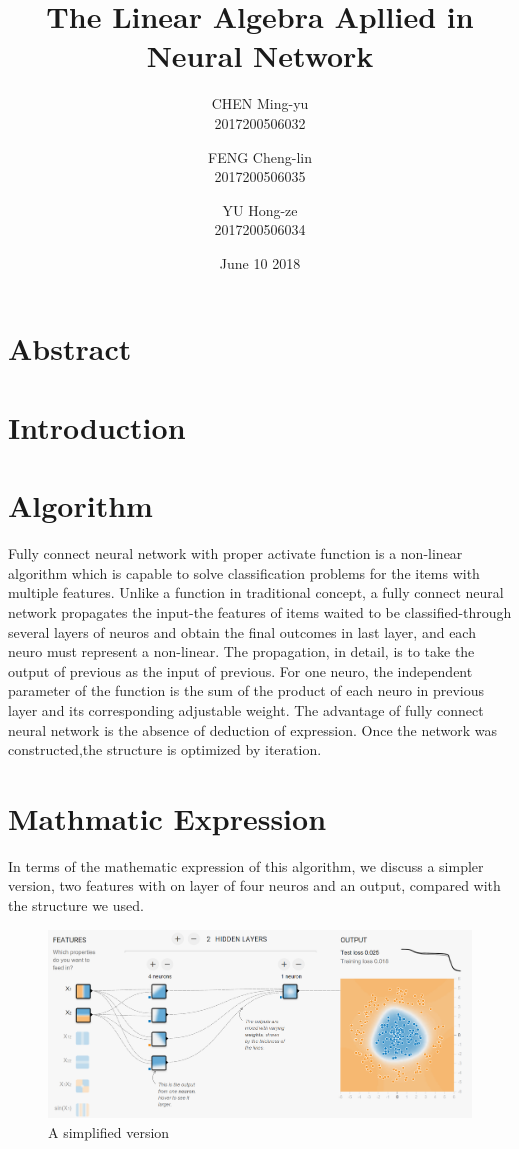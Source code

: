 \documentclass{article}
\title{The Linear Algebra Apllied in Neural Network}
\author{CHEN Ming-yu\\2017200506032\\
    \and FENG Cheng-lin\\2017200506035\\
    \and YU Hong-ze\\2017200506034\\}
\date{June 10 2018}
\begin{document}
    \maketitle
    \begin{spacing}{2}
    \linespread{2}
    \section{Abstract}

    \section{Introduction}

    \section{Algorithm}

    Fully connect neural network with proper activate function is a non-linear algorithm which is capable to solve classification problems for the items with multiple features. Unlike a function in traditional concept, a fully connect neural network propagates the input-the features of items waited to be classified-through several layers of neuros and obtain the final outcomes in last layer, and each neuro must represent a non-linear. The propagation, in detail, is to take the output of previous as the input of previous. For one neuro, the independent parameter of the function is the sum of the product of each neuro in previous layer and its corresponding adjustable weight. The advantage of fully connect neural network is the absence of deduction of expression. Once the network was constructed,the structure is optimized by iteration. 

    \section{Mathmatic Expression}

    In terms of the mathematic expression of this algorithm, we discuss a simpler version, two features with on layer of four neuros and an output, compared with the structure we used.\\

    \begin{figure}[H]
        \centering 
        \includegraphics[width=1\textwidth]{TF_Playground}
        \caption{A simplified version\cite{TF_Playground}}
        \end{figure} 
        

\end{spacing}
\end{document}
